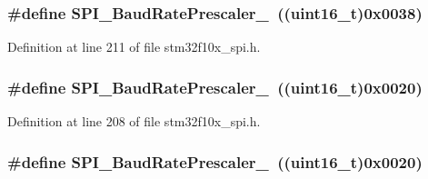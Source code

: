 \subsubsection[{\texorpdfstring{S\+P\+I\+\_\+\+Baud\+Rate\+Prescaler\+\_\+256}{SPI_BaudRatePrescaler_256}}]{\setlength{\rightskip}{0pt plus 5cm}\#define S\+P\+I\+\_\+\+Baud\+Rate\+Prescaler\+\_~(({\bf uint16\+\_\+t})0x0038)}\hypertarget{group___s_p_i___baud_rate___prescaler_ga1e1aa6406f0e88ac557ba49fb8069e3e}{}\label{group___s_p_i___baud_rate___prescaler_ga1e1aa6406f0e88ac557ba49fb8069e3e}


Definition at line 211 of file stm32f10x\+\_\+spi.\+h.

\subsubsection[{\texorpdfstring{S\+P\+I\+\_\+\+Baud\+Rate\+Prescaler\+\_\+32}{SPI_BaudRatePrescaler_32}}]{\setlength{\rightskip}{0pt plus 5cm}\#define S\+P\+I\+\_\+\+Baud\+Rate\+Prescaler\+\_~(({\bf uint16\+\_\+t})0x0020)}\hypertarget{group___s_p_i___baud_rate___prescaler_ga1d30cecaa412cee5250c69644207c652}{}\label{group___s_p_i___baud_rate___prescaler_ga1d30cecaa412cee5250c69644207c652}


Definition at line 208 of file stm32f10x\+\_\+spi.\+h.

\subsubsection[{\texorpdfstring{S\+P\+I\+\_\+\+Baud\+Rate\+Prescaler\+\_\+32}{SPI_BaudRatePrescaler_32}}]{\setlength{\rightskip}{0pt plus 5cm}\#define S\+P\+I\+\_\+\+Baud\+Rate\+Prescaler\+\_~(({\bf uint16\+\_\+t})0x0020)}\hypertarget{group___s_p_i___baud_rate___prescaler_ga1d30cecaa412cee5250c69644207c652}{}\label{group___s_p_i___baud_rate___prescaler_ga1d30cecaa412cee5250c69644207c652}


